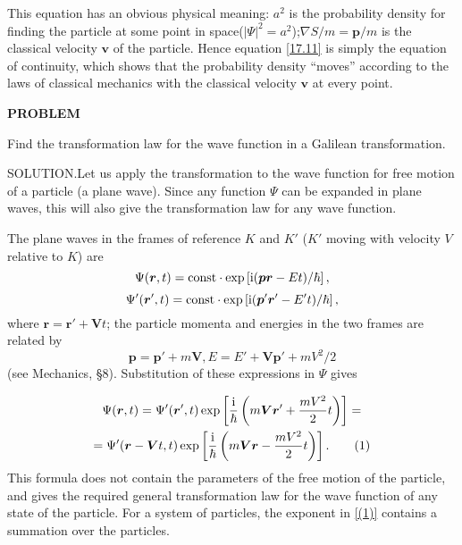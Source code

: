 This equation has an obvious physical meaning: $ a^2 $ is the probability density for finding the particle at some point in space($ \lvert\Psi\rvert^2=a^2 $);$ \nabla S/m=\bm{p}/m $ is the classical velocity $ \bm{v} $ of the particle. Hence equation \eqref{17.11} is simply the equation of continuity, which shows that the probability density “moves” according to the laws of classical mechanics with the classical velocity $ \bm{v} $ at every point.




{\small \textbf{PROBLEM}
	
	
Find the transformation law for the wave function in a Galilean transformation.





SOLUTION.Let us apply the transformation to the wave function for free motion of a particle (a plane wave). Since any function $\Psi$ can be expanded in plane waves, this will also give the transformation law for any wave function.

The plane waves in the frames of reference $ K $ and $ K' $ ($ K' $ moving with velocity $ V $ relative to $ K $) are
\[ \Psi(\bm{r},t)=\text{const}\cdot\exp\left[\mathrm{i}(\bm{p}\bm{r}-Et)/\hbar \right], \]
\[ \Psi'(\bm{r}',t)=\text{const}\cdot\exp\left[\mathrm{i}(\bm{p}'\bm{r}'-E't)/\hbar \right], \]
where $ \bm{r} = \bm{r}' + \bm{V}t $; the particle momenta and energies in the two frames are related by
\[ \bm{p}=\bm{p}'+m\bm{V},E=E'+\bm{V}\bm{p}'+mV^2/2 \]
(see Mechanics, \S8). Substitution of these expressions in $\Psi$ gives


\begin{multline}\label{(1)}
\Psi(\bm{r},t)=\Psi'(\bm{r}',t)\exp\left[\frac{\mathrm{i}}{\hbar}\left( m\bm{V}\bm{r}'+\frac{mV^2}{2}t\right)\right]=\notag\\
=\Psi'(\bm{r}-\bm{V}t,t)\exp\left[ \frac{\mathrm{i}}{\hbar}\left( m\bm{V}\bm{r}-\frac{mV^2}{2}t \right)\right].\tag{1}
\end{multline}
This formula does not contain the parameters of the free motion of the particle, and gives the required general transformation law for the wave function of any state of the particle. For a system of particles, the exponent in \eqref{(1)} contains a summation over the particles.
}
